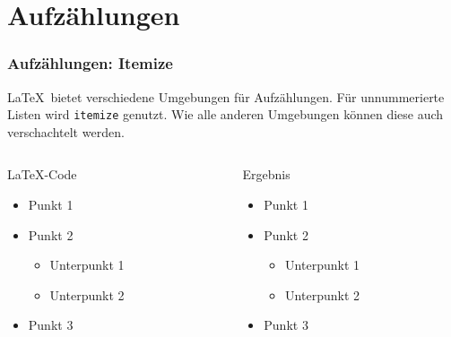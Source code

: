 \section{Aufzählungen}
\begin{frame}[fragile]
    \frametitle{Aufzählungen: Itemize}
    \LaTeX \ bietet verschiedene Umgebungen für Aufzählungen. Für unnummerierte Listen wird \texttt{itemize} genutzt.
    Wie alle anderen Umgebungen können diese auch verschachtelt werden.
    \begin{columns}[t]
        \begin{column}{0.47\textwidth}
            \begin{block}{\LaTeX-Code}
                \begin{lstverbatim}
                \begin{itemize}
                    \item Punkt 1
                    \item Punkt 2
                        \begin{itemize}%
                            \item Unterpunkt 1
                            \item Unterpunkt 2
                        \end{itemize}
                    \item Punkt 3
                \end{itemize}
                \end{lstverbatim}
            \end{block}
        \end{column}
        \begin{column}{0.47\textwidth}
            \begin{block}{Ergebnis}
                \begin{itemize}
                    \item Punkt 1
                    \item Punkt 2
                        \begin{itemize}  %
                            \item Unterpunkt 1
                            \item Unterpunkt 2
                        \end{itemize}
                    \item Punkt 3
                \end{itemize}
            \end{block}
        \end{column}
    \end{columns}
\end{frame}

